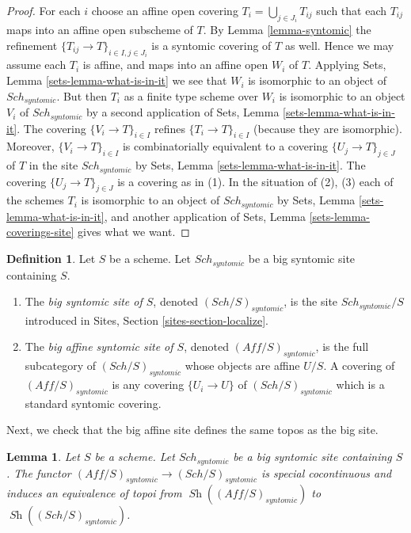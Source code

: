 \documentclass{stacks-project}
\theoremstyle{plain}
\newtheorem{lemma}[subsection]{Lemma}
\theoremstyle{definition}
\newtheorem{definition}[subsection]{Definition}
\theoremstyle{remark}
\numberwithin{equation}{subsection}
\def\Sch{\mathit{Sch}}
\def\Sh{\mathop{\mathit{Sh}}\nolimits}
\begin{document}
\begin{proof}
For each $i$ choose an affine open covering $T_i = \bigcup_{j \in J_i} T_{ij}$
such that each $T_{ij}$ maps into an affine open subscheme of $T$. By
Lemma \ref{lemma-syntomic}
the refinement $\{T_{ij} \to T\}_{i \in I, j \in J_i}$ is a syntomic covering
of $T$ as well. Hence we may assume each $T_i$ is affine, and maps into
an affine open $W_i$ of $T$. Applying
Sets, Lemma \ref{sets-lemma-what-is-in-it}
we see that $W_i$ is isomorphic to an object of $\Sch_{syntomic}$.
But then $T_i$ as a finite type scheme over $W_i$
is isomorphic to an object $V_i$ of $\Sch_{syntomic}$ by a second
application of
Sets, Lemma \ref{sets-lemma-what-is-in-it}.
The covering $\{V_i \to T\}_{i \in I}$ refines $\{T_i \to T\}_{i \in I}$
(because they are isomorphic).
Moreover, $\{V_i \to T\}_{i \in I}$ is combinatorially equivalent to a
covering $\{U_j \to T\}_{j \in J}$ of $T$ in the site
$\Sch_{syntomic}$ by
Sets, Lemma \ref{sets-lemma-what-is-in-it}.
The covering $\{U_j \to T\}_{j \in J}$ is a covering as in (1).
In the situation of (2), (3) each of the
schemes $T_i$ is isomorphic to an object of $\Sch_{syntomic}$ by
Sets, Lemma \ref{sets-lemma-what-is-in-it},
and another application of
Sets, Lemma \ref{sets-lemma-coverings-site}
gives what we want.
\end{proof}

\begin{definition}
\label{definition-big-small-syntomic}
Let $S$ be a scheme. Let $\Sch_{syntomic}$ be a big syntomic
site containing $S$.
\begin{enumerate}
\item The {\it big syntomic site of $S$}, denoted
$(\Sch/S)_{syntomic}$, is the site $\Sch_{syntomic}/S$
introduced in Sites, Section \ref{sites-section-localize}.
\item The {\it big affine syntomic site of $S$}, denoted
$(\textit{Aff}/S)_{syntomic}$, is the full subcategory of
$(\Sch/S)_{syntomic}$ whose objects are affine $U/S$.
A covering of $(\textit{Aff}/S)_{syntomic}$ is any covering
$\{U_i \to U\}$ of $(\Sch/S)_{syntomic}$ which is a
standard syntomic covering.
\end{enumerate}
\end{definition}

\noindent
Next, we check that the big affine site defines the same
topos as the big site.

\begin{lemma}
\label{lemma-affine-big-site-syntomic}
Let $S$ be a scheme. Let $\Sch_{syntomic}$ be a big syntomic
site containing $S$.
The functor
$(\textit{Aff}/S)_{syntomic} \to (\Sch/S)_{syntomic}$
is special cocontinuous and induces an equivalence of topoi from
$\Sh((\textit{Aff}/S)_{syntomic})$ to
$\Sh((\Sch/S)_{syntomic})$.
\end{lemma}
\end{document}
